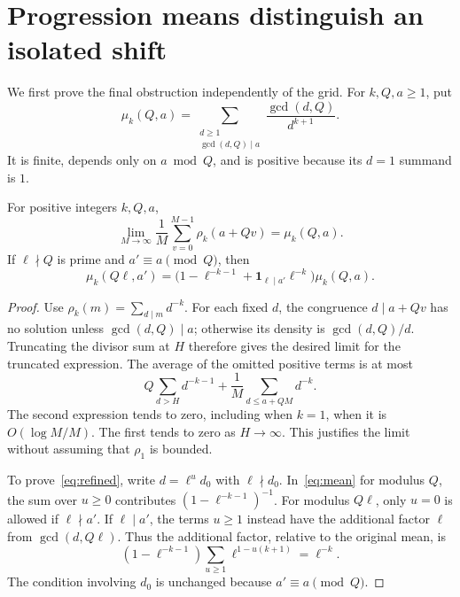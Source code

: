 \section{Progression means distinguish an isolated shift}
We first prove the final obstruction independently of the grid.
For $k,Q,a\geq1$, put
\begin{equation}\label{eq:mean}
 \mu_k(Q,a)=
 \sum_{\substack{d\geq1\\\gcd(d,Q)\mid a}}
          \frac{\gcd(d,Q)}{d^{k+1}}.
\end{equation}
It is finite, depends only on $a\bmod Q$, and is positive because
its $d=1$ summand is $1$.

\begin{lemma}\label{lem:average}
For positive integers $k,Q,a$,
\begin{equation}\label{eq:cesaro}
 \lim_{M\to\infty}\frac1M\sum_{v=0}^{M-1}\rho_k(a+Qv)
       =\mu_k(Q,a).
\end{equation}
If $\ell\nmid Q$ is prime and $a'\equiv a\pmod Q$, then
\begin{equation}\label{eq:refined}
 \mu_k(Q\ell,a')=
 \bigl(1-\ell^{-k-1}+\mathbf1_{\ell\mid a'}\ell^{-k}\bigr)
              \mu_k(Q,a).
\end{equation}
\end{lemma}
\begin{proof}
Use $\rho_k(m)=\sum_{d\mid m}d^{-k}$. For each fixed $d$, the
congruence $d\mid a+Qv$ has no solution unless $\gcd(d,Q)\mid a$;
otherwise its density is $\gcd(d,Q)/d$. Truncating the divisor sum
at $H$ therefore gives the desired limit for the truncated expression.
The average of the omitted positive terms is at most
\[
 Q\sum_{d>H}d^{-k-1}
       +\frac1M\sum_{d\leq a+QM}d^{-k}.
\]
The second expression tends to zero, including when $k=1$, when it
is $O(\log M/M)$. The first tends to zero as $H\to\infty$.
This justifies the limit without assuming that $\rho_1$ is bounded.

To prove~\eqref{eq:refined}, write $d=\ell^u d_0$ with
$\ell\nmid d_0$. In~\eqref{eq:mean} for modulus $Q$, the sum over
$u\geq0$ contributes $(1-\ell^{-k-1})^{-1}$. For modulus $Q\ell$,
only $u=0$ is allowed if $\ell\nmid a'$. If $\ell\mid a'$, the
terms $u\geq1$ instead have the additional factor $\ell$ from
$\gcd(d,Q\ell)$. Thus the additional factor, relative to the
original mean, is
\[
 (1-\ell^{-k-1})\sum_{u\geq1}\ell^{1-u(k+1)}=\ell^{-k}.
\]
The condition involving $d_0$ is unchanged because $a'\equiv a\pmod Q$.
\end{proof}


